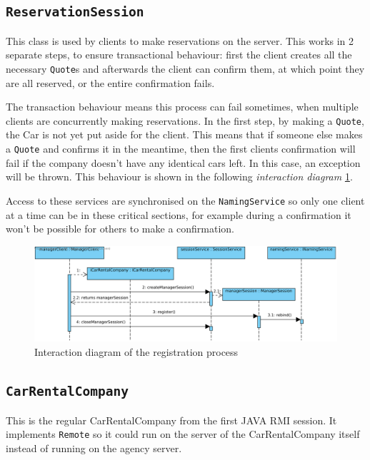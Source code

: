 \documentclass[a4paper]{article}
\begin{document}
\subsection{\texttt{ReservationSession}}
This class is used by clients to make reservations on the server. This works in 2 separate steps, to ensure transactional behaviour: first the client creates all the necessary \texttt{Quote}s and afterwards the client can confirm them, at which point they are all reserved, or the entire confirmation fails. 

The transaction behaviour means this process can fail sometimes, when multiple clients are concurrently making reservations. In the first step, by making a \texttt{Quote}, the Car is not yet put aside for the client. This means that if someone else makes a \texttt{Quote} and confirms it in the meantime, then the first clients confirmation will fail if the company doesn't have any identical cars left. In this case, an exception will be thrown. This behaviour is shown in the following  \emph{interaction diagram} \ref{fig:failed_confirmation_diagram}. 

Access to these services are synchronised on the \texttt{NamingService} so only one client at a time can be in these critical sections, for example during a confirmation it won't be possible for others to make a confirmation.
\begin{figure}[hbtp]
\centering
\includegraphics[width=\textwidth]{img/CarRentalCompany registration process.png}
\caption{Interaction diagram of the registration process}
\label{fig:failed_confirmation_diagram}
\end{figure}

\subsection{\texttt{CarRentalCompany}}
This is the regular CarRentalCompany from the first JAVA RMI session. It implements \texttt{Remote} so it could run on the server of the CarRentalCompany itself instead of running on the agency server. 
\end{document}
